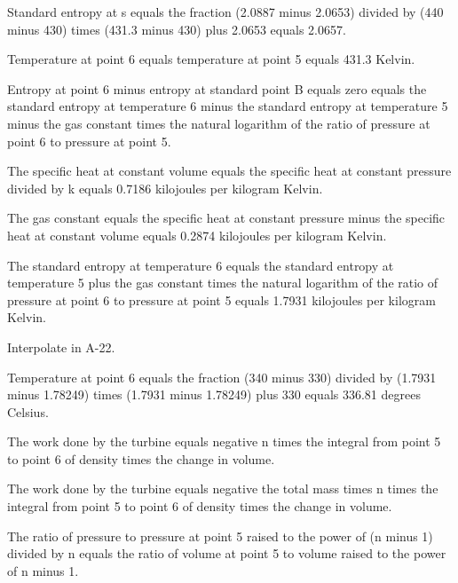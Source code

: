 Standard entropy at s equals the fraction (2.0887 minus 2.0653) divided by (440 minus 430) times (431.3 minus 430) plus 2.0653 equals 2.0657.

Temperature at point 6 equals temperature at point 5 equals 431.3 Kelvin.

Entropy at point 6 minus entropy at standard point B equals zero equals the standard entropy at temperature 6 minus the standard entropy at temperature 5 minus the gas constant times the natural logarithm of the ratio of pressure at point 6 to pressure at point 5.

The specific heat at constant volume equals the specific heat at constant pressure divided by k equals 0.7186 kilojoules per kilogram Kelvin.

The gas constant equals the specific heat at constant pressure minus the specific heat at constant volume equals 0.2874 kilojoules per kilogram Kelvin.

The standard entropy at temperature 6 equals the standard entropy at temperature 5 plus the gas constant times the natural logarithm of the ratio of pressure at point 6 to pressure at point 5 equals 1.7931 kilojoules per kilogram Kelvin.

Interpolate in A-22.

Temperature at point 6 equals the fraction (340 minus 330) divided by (1.7931 minus 1.78249) times (1.7931 minus 1.78249) plus 330 equals 336.81 degrees Celsius.

The work done by the turbine equals negative n times the integral from point 5 to point 6 of density times the change in volume.

The work done by the turbine equals negative the total mass times n times the integral from point 5 to point 6 of density times the change in volume.

The ratio of pressure to pressure at point 5 raised to the power of (n minus 1) divided by n equals the ratio of volume at point 5 to volume raised to the power of n minus 1.